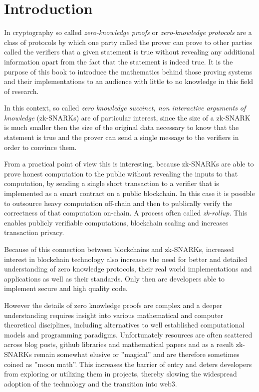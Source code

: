 \chapter{Introduction}
In cryptography so called \textit{zero-knowledge proofs} or \textit{zero-knowledge protocols} are a class of protocols by which one party called the prover can prove to other parties called the verifiers that a given statement is true without revealing any additional information apart from the fact that the statement is indeed true. It is the purpose of this book to introduce the mathematics behind those proving systems and their implementations to an audience with little to no knowledge in this field of research.

In this context, so called \textit{zero knowledge succinct, non interactive arguments of knowledge} (zk-SNARKs) are of particular interest, since the size of a zk-SNARK is much smaller then the size of the original data necessary to know that the statement is true and the prover can send a single message to the verifiers in order to convince them.

From a practical point of view this is interesting, because zk-SNARKs are able to prove honest computation to the public without revealing the inputs to that computation, by sending a single short transaction to a verifier that is implemented as a smart contract on a public blockchain. In this case it is possible to outsource heavy computation off-chain and then to publically verify the correctness of that computation on-chain. A process often called \textit{zk-rollup}. This enables publicly verifiable computations, blockchain scaling and increases transaction privacy.  

Because of this connection between blockchains and zk-SNARKs, increased interest in blockchain technology also increases the need for better and detailed understanding of zero knowledge protocols, their real world implementations and applications as well as their standards. Only then are developers able to implement secure and high quality code.

However the details of zero knowledge proofs are complex and a deeper understanding requires insight into various mathematical and computer theoretical disciplines, including alternatives to well established computational models and programming paradigms. Unfortunately resources are often scattered across blog posts, github libraries and mathematical papers and as a result zk-SNARKs remain somewhat elusive or ''magical'' and are therefore sometimes coined as ''moon math''. This increases the barrier of entry and deters developers from exploring or utilizing them in projects, thereby slowing the widespread adoption of the technology and the transition into web3.

